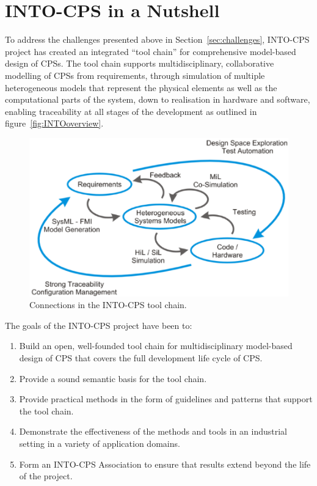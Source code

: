 \section{INTO-CPS in a Nutshell}\label{sec:nutshell}



To address the challenges presented above in Section~\ref{sec:challenges}, INTO-CPS project has created an integrated ``tool chain'' for comprehensive model-based design of CPSs. The tool chain supports multidisciplinary, collaborative modelling of CPSs from requirements, through simulation of multiple heterogeneous models that represent the physical elements as well as the computational parts of the system, down to realisation in hardware and software, enabling traceability at all stages of the development as outlined in figure~\ref{fig:INTOoverview}.

\begin{figure}[ht]
\centering
\includegraphics[width=\textwidth]{./figures/INTOoverview}
\caption{Connections in the INTO-CPS tool chain.}
\label{fig:intooverview}
\end{figure}

The goals of the INTO-CPS project have been to:
\begin{enumerate}
\item Build an open, well-founded tool chain for multidisciplinary model-based design of CPS that covers the full development life cycle of CPS.
\item Provide a sound semantic basis for the tool chain.
\item Provide practical methods in the form of guidelines and patterns that support the tool chain.
\item Demonstrate the effectiveness of the methods and tools in an industrial setting in a variety of application domains.
\item Form an INTO-CPS Association to ensure that results extend beyond the life of the project.
\end{enumerate}

